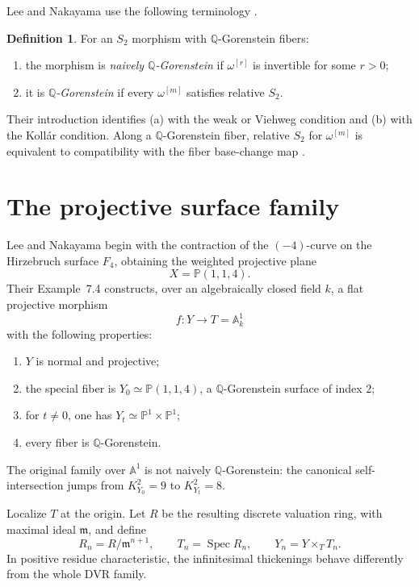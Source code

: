 \documentclass[10pt,reqno]{amsart}
\theoremstyle{definition}
\newtheorem{definition}[theorem]{Definition}
\begin{document}
Lee and Nakayama use the following terminology \cite[Definition~7.1]{LeeNakayama}.

\begin{definition}
For an $S_2$ morphism with $\mathbb Q$-Gorenstein fibers:
\begin{enumerate}[label=\textup{(\alph*)}]
  \item the morphism is \emph{naively $\mathbb Q$-Gorenstein} if $\omega^{[r]}$ is invertible for some $r>0$;
  \item it is \emph{$\mathbb Q$-Gorenstein} if every $\omega^{[m]}$ satisfies relative $S_2$.
\end{enumerate}
\end{definition}
Their introduction identifies (a) with the weak or Viehweg condition and (b) with the Koll\'ar condition. Along a $\mathbb Q$-Gorenstein fiber, relative $S_2$ for $\omega^{[m]}$ is equivalent to compatibility with the fiber base-change map \cite[Remark~7.6]{LeeNakayama}.

\section{The projective surface family}

Lee and Nakayama begin with the contraction of the $(-4)$-curve on the Hirzebruch surface $F_4$, obtaining the weighted projective plane
\[
  X=\mathbb P(1,1,4).
\]
Their Example~7.4 constructs, over an algebraically closed field $k$, a flat projective morphism
\[
  f:Y\longrightarrow T=\mathbb A^1_k
\]
with the following properties:
\begin{enumerate}
  \item $Y$ is normal and projective;
  \item the special fiber is $Y_0\simeq\mathbb P(1,1,4)$, a $\mathbb Q$-Gorenstein surface of index $2$;
  \item for $t\neq0$, one has $Y_t\simeq\mathbb P^1\times\mathbb P^1$;
  \item every fiber is $\mathbb Q$-Gorenstein.
\end{enumerate}
The original family over $\mathbb A^1$ is not naively $\mathbb Q$-Gorenstein: the canonical self-intersection jumps from $K_{Y_0}^2=9$ to $K_{Y_t}^2=8$.

Localize $T$ at the origin. Let $R$ be the resulting discrete valuation ring, with maximal ideal $\mathfrak m$, and define
\[
  R_n=R/\mathfrak m^{n+1},
  \qquad T_n=\operatorname{Spec}R_n,
  \qquad Y_n=Y\times_TT_n.
\]
In positive residue characteristic, the infinitesimal thickenings behave differently from the whole DVR family.
\end{document}
